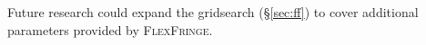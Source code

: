\documentclass[11pt]{article}
\newcommand{\todo}[1]{\textcolor{red}{(TODO: {#1})}}
\begin{document}
Future research could expand the gridsearch (\S \ref{sec:ff}) to cover additional parameters provided by  \textsc{FlexFringe}.



%





\end{document}
